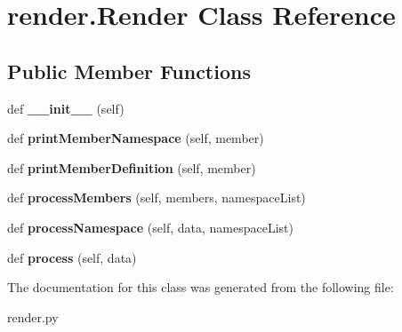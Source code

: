\hypertarget{classrender_1_1Render}{}\section{render.\+Render Class Reference}
\label{classrender_1_1Render}
\subsection*{Public Member Functions}
\begin{DoxyCompactItemize}
\item 
\mbox{\label{classrender_1_1Render_a78b431272b903560975d20eb3dd1ef82}} 
def {\bfseries \+\_\+\+\_\+init\+\_\+\+\_\+} (self)
\item 
\mbox{\label{classrender_1_1Render_a5b95bb89cf5b7588019241358ec16a8f}} 
def {\bfseries print\+Member\+Namespace} (self, member)
\item 
\mbox{\label{classrender_1_1Render_ac46ecd0f59ee6021e7aaa0b6ca942845}} 
def {\bfseries print\+Member\+Definition} (self, member)
\item 
\mbox{\label{classrender_1_1Render_a7dbaacfbdc2910be01c87b28f5ce74ce}} 
def {\bfseries process\+Members} (self, members, namespace\+List)
\item 
\mbox{\label{classrender_1_1Render_abd6e148975e32c27d3c6910394cccf02}} 
def {\bfseries process\+Namespace} (self, data, namespace\+List)
\item 
\mbox{\label{classrender_1_1Render_a174a5878777413ccdc36a556cf36c437}} 
def {\bfseries process} (self, data)
\end{DoxyCompactItemize}


The documentation for this class was generated from the following file\+:\begin{DoxyCompactItemize}
\item 
render.\+py\end{DoxyCompactItemize}
